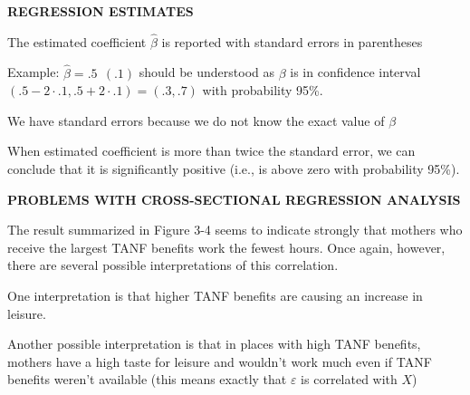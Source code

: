 \documentclass[landscape]{slides}
\begin{document}
\begin{slide}
\begin{center}
{\bf REGRESSION ESTIMATES}
\end{center}

The estimated coefficient $\hat{\beta}$ is reported with standard errors in parentheses

Example: $\hat{\beta}=.5 \:\: (.1)$ should be understood as
$\beta$ is in confidence interval $(.5-2\cdot .1,.5+2 \cdot .1)=(.3,.7)$ with probability 95\%.

We have standard errors because we do not know the exact value of $\beta$

When estimated coefficient is more than twice the standard error, we can
conclude that it is significantly positive (i.e., is above zero with probability 95\%).






\end{slide}


\begin{slide}

\end{slide}



\begin{slide}
\begin{center}
{\bf PROBLEMS WITH CROSS-SECTIONAL REGRESSION ANALYSIS}
\end{center}

The result summarized in Figure 3-4 seems to indicate strongly that mothers who receive the largest TANF benefits work the fewest hours. Once again, however, there are several possible interpretations of this correlation.

One interpretation is that higher TANF benefits are causing an increase in leisure.

Another possible interpretation is that in places with high TANF benefits,
 mothers have a high taste for leisure and wouldn't work much even if TANF benefits weren't available
 (this means exactly that $\varepsilon$ is correlated with $X$)
\end{slide}
\end{document}
